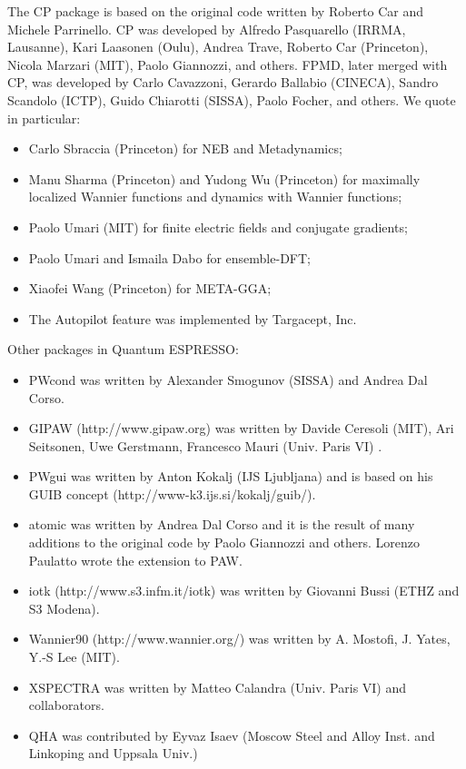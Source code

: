 \documentclass[12pt,a4paper]{article}
\def\qe{{\sc Quantum ESPRESSO}}
\begin{document}
The CP package is based on the original code written by Roberto Car
and Michele Parrinello. CP was developed by Alfredo Pasquarello
(IRRMA, Lausanne), Kari Laasonen (Oulu), Andrea Trave, Roberto
Car (Princeton), Nicola Marzari (MIT), Paolo Giannozzi, and others.
FPMD, later merged with CP, was developed by Carlo Cavazzoni, 
Gerardo Ballabio (CINECA), Sandro Scandolo (ICTP), 
Guido Chiarotti (SISSA), Paolo Focher, and others.
We quote in particular:
\begin{itemize}
  \item Carlo Sbraccia (Princeton) for NEB and Metadynamics;
  \item Manu Sharma (Princeton) and Yudong Wu (Princeton) for
   maximally localized Wannier functions and dynamics with 
   Wannier functions;
  \item Paolo Umari (MIT) for finite electric fields and conjugate
   gradients;
  \item Paolo Umari and Ismaila Dabo for ensemble-DFT;
  \item Xiaofei Wang (Princeton) for META-GGA;
  \item The Autopilot feature was implemented by Targacept, Inc.
\end{itemize}
Other packages in \qe:
\begin{itemize}
\item
PWcond was written by Alexander Smogunov (SISSA) and Andrea 
Dal Corso.
\item
GIPAW (http://www.gipaw.org) was written by Davide Ceresoli
(MIT), Ari Seitsonen, Uwe Gerstmann,  Francesco Mauri (Univ.
Paris VI) .
\item
PWgui was written by Anton Kokalj (IJS Ljubljana) and is based on his
GUIB concept (http://www-k3.ijs.si/kokalj/guib/).
\item
atomic was written by Andrea Dal Corso and it is the result 
of many additions to the original code by Paolo Giannozzi 
and others. Lorenzo Paulatto wrote the extension to PAW.
\item
iotk (http://www.s3.infm.it/iotk) was written by Giovanni Bussi 
(ETHZ and S3 Modena).
\item
Wannier90 (http://www.wannier.org/) was written by A. Mostofi, 
J. Yates, Y.-S Lee (MIT).
\item
XSPECTRA was written by Matteo Calandra (Univ. Paris VI)
and collaborators.
\item
QHA was contributed by Eyvaz Isaev (Moscow Steel and Alloy 
Inst. and Linkoping and Uppsala Univ.)
\end{itemize}
\end{document}
